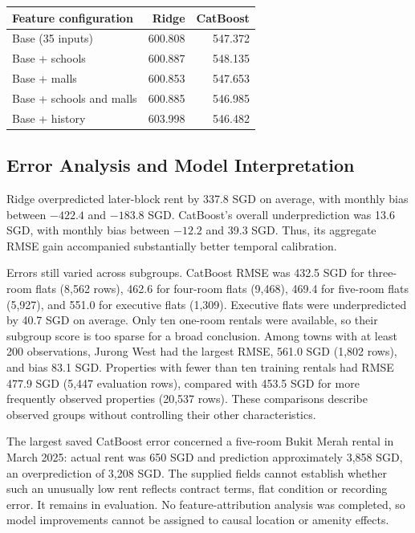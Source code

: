 \documentclass[conference]{IEEEtran}
\makeatletter
\newenvironment{localtable}{\par\addvspace{\medskipamount}\noindent
  \begin{minipage}{\columnwidth}\def\@captype{table}}{\end{minipage}\par
  \addvspace{\medskipamount}}
\makeatother
\begin{document}
\begin{localtable}
  \caption{Earlier-fold mean RMSE (SGD) at fixed selected parameters.
  CatBoost uses depth 8, learning rate 0.05, regularisation 3; Ridge uses
  $\alpha=10$. Each addition is separate.}
  \label{tab:ablation}
  \centering\small
  \begin{tabularx}{\columnwidth}{Xrr}
    \toprule
    Feature configuration & Ridge & CatBoost \\
    \midrule
    Base (35 inputs) & 600.808 & 547.372 \\
    Base + schools & 600.887 & 548.135 \\
    Base + malls & 600.853 & 547.653 \\
    Base + schools and malls & 600.885 & 546.985 \\
    Base + history & 603.998 & 546.482 \\
    \bottomrule
  \end{tabularx}
\end{localtable}

\subsection{Error Analysis and Model Interpretation}
Ridge overpredicted later-block rent by 337.8 SGD on average, with monthly
bias between $-422.4$ and $-183.8$ SGD. CatBoost's overall underprediction
was 13.6 SGD, with monthly bias between $-12.2$ and 39.3 SGD. Thus, its
aggregate RMSE gain accompanied substantially better temporal calibration.

Errors still varied across subgroups. CatBoost RMSE was 432.5 SGD for
three-room flats (8,562 rows), 462.6 for four-room flats (9,468), 469.4 for
five-room flats (5,927), and 551.0 for executive flats (1,309). Executive
flats were underpredicted by 40.7 SGD on average. Only ten one-room rentals
were available, so their subgroup score is too sparse for a broad conclusion.
Among towns with at least 200 observations, Jurong West had the largest
RMSE, 561.0 SGD (1,802 rows), and bias 83.1 SGD. Properties with fewer than
ten training rentals had RMSE 477.9 SGD (5,447 evaluation rows), compared
with 453.5 SGD for more frequently observed properties (20,537 rows).
These comparisons describe observed groups without controlling their other
characteristics.

The largest saved CatBoost error concerned a five-room Bukit Merah rental
in March 2025: actual rent was 650 SGD and prediction approximately 3,858
SGD, an overprediction of 3,208 SGD. The supplied fields cannot establish
whether such an unusually low rent reflects contract terms, flat condition
or recording error. It remains in evaluation. No feature-attribution
analysis was completed, so model improvements cannot be assigned to causal
location or amenity effects.
\end{document}
